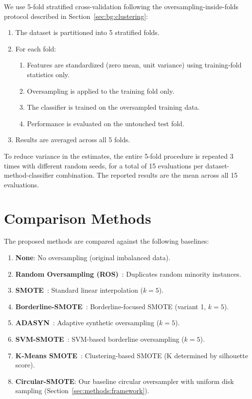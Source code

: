 We use 5-fold stratified cross-validation following the oversampling-inside-folds protocol described in Section~\ref{sec:bg:clustering}:

\begin{enumerate}[leftmargin=*]
    \item The dataset is partitioned into 5 stratified folds.
    \item For each fold:
    \begin{enumerate}
        \item Features are standardized (zero mean, unit variance) using training-fold statistics only.
        \item Oversampling is applied to the training fold only.
        \item The classifier is trained on the oversampled training data.
        \item Performance is evaluated on the untouched test fold.
    \end{enumerate}
    \item Results are averaged across all 5 folds.
\end{enumerate}

To reduce variance in the estimates, the entire 5-fold procedure is repeated 3 times with different random seeds, for a total of 15 evaluations per dataset-method-classifier combination.
The reported results are the mean across all 15 evaluations.


\section{Comparison Methods}
\label{sec:setup:comparison}

The proposed methods are compared against the following baselines:

\begin{enumerate}[leftmargin=*]
    \item \textbf{None}: No oversampling (original imbalanced data).
    \item \textbf{Random Oversampling (ROS)}~\cite{batista2004study}: Duplicates random minority instances.
    \item \textbf{SMOTE}~\cite{chawla2002smote}: Standard linear interpolation ($k=5$).
    \item \textbf{Borderline-SMOTE}~\cite{han2005borderline}: Borderline-focused SMOTE (variant 1, $k=5$).
    \item \textbf{ADASYN}~\cite{he2008adasyn}: Adaptive synthetic oversampling ($k=5$).
    \item \textbf{SVM-SMOTE}~\cite{nguyen2011borderline}: SVM-based borderline oversampling ($k=5$).
    \item \textbf{K-Means SMOTE}~\cite{douzas2018improving}: Clustering-based SMOTE (K determined by silhouette score).
    \item \textbf{Circular-SMOTE}: Our baseline circular oversampler with uniform disk sampling (Section~\ref{sec:methods:framework}).
\end{enumerate}

